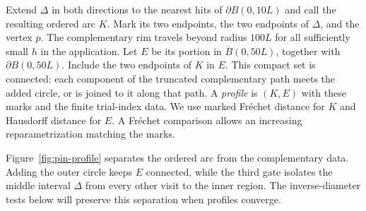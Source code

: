 Extend $\Delta$ in both directions to the nearest hits of
$\partial B(0,10L)$ and call the resulting ordered arc $K$.  Mark its
two endpoints, the two endpoints of $\Delta$, and the vertex $p$.  The
complementary rim travels beyond radius $100L$ for all sufficiently small
$h$ in the application.  Let $E$ be its portion in
$\overline B(0,50L)$, together with $\partial B(0,50L)$.  Include the two
endpoints of $K$ in $E$.  This compact set is connected: each component
of the truncated complementary path meets the added circle, or is joined
to it along that path.  A \emph{profile} is $(K,E)$ with these marks and
the finite trial-index data.  We use marked Fr\'echet distance for $K$
and Hausdorff distance for $E$.  A Fr\'echet comparison allows an
increasing reparametrization matching the marks.

Figure~\ref{fig:pin-profile} separates the ordered arc from the
complementary data.  Adding the outer circle keeps $E$ connected, while
the third gate isolates the middle interval $\Delta$ from every other
visit to the inner region.  The inverse-diameter tests below will
preserve this separation when profiles converge.

